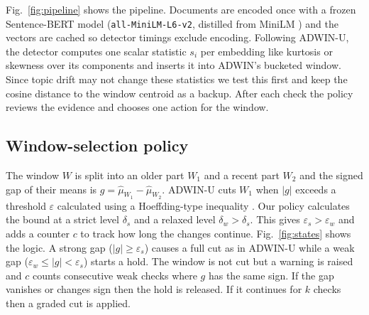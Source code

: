 \documentclass[conference]{IEEEtran}
\begin{document}
Fig.~\ref{fig:pipeline} shows the pipeline. Documents are encoded once with a frozen Sentence-BERT model (\texttt{all-MiniLM-L6-v2}, distilled from MiniLM \cite{wang2020}) and the vectors are cached so detector timings exclude encoding. Following ADWIN-U, the detector computes one scalar statistic $s_i$ per embedding like kurtosis or skewness over its components and inserts it into ADWIN's bucketed window. Since topic drift may not change these statistics we test this first and keep the cosine distance to the window centroid as a backup. After each check the policy reviews the evidence and chooses one action for the window.



\subsection{Window-selection policy}

The window $W$ is split into an older part $W_1$ and a recent part $W_2$ and the signed gap of their means is $g=\hat\mu_{W_1}-\hat\mu_{W_2}$. ADWIN-U cuts $W_1$ when $|g|$ exceeds a threshold $\varepsilon$ calculated using a Hoeffding-type inequality \cite{bifet2007}. Our policy calculates the bound at a strict level $\delta_s$ and a relaxed level $\delta_w>\delta_s$. This gives $\varepsilon_s>\varepsilon_w$ and adds a counter $c$ to track how long the changes continue. Fig.~\ref{fig:states} shows the logic. A strong gap ($|g|\ge\varepsilon_s$) causes a full cut as in ADWIN-U while a weak gap ($\varepsilon_w\le|g|<\varepsilon_s$) starts a hold. The window is not cut but a warning is raised and $c$ counts consecutive weak checks where $g$ has the same sign. If the gap vanishes or changes sign then the hold is released. If it continues for $k$ checks then a graded cut is applied.
\end{document}

